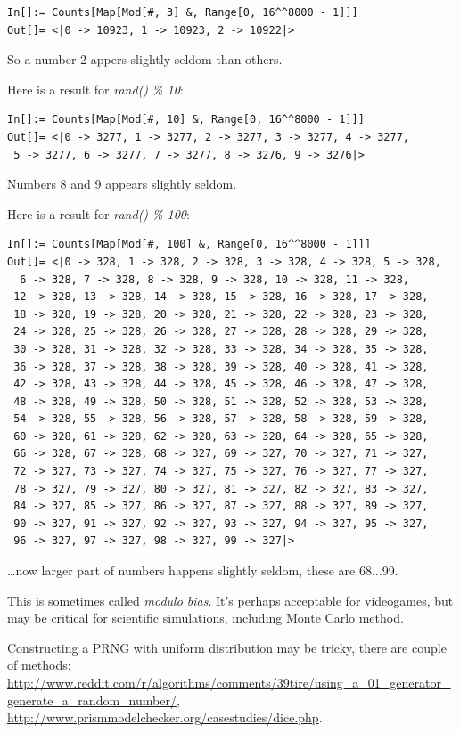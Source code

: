 \begin{lstlisting}
In[]:= Counts[Map[Mod[#, 3] &, Range[0, 16^^8000 - 1]]]
Out[]= <|0 -> 10923, 1 -> 10923, 2 -> 10922|>
\end{lstlisting}

So a number 2 appers slightly seldom than others.

Here is a result for \textit{rand() \% 10}:

\begin{lstlisting}
In[]:= Counts[Map[Mod[#, 10] &, Range[0, 16^^8000 - 1]]]
Out[]= <|0 -> 3277, 1 -> 3277, 2 -> 3277, 3 -> 3277, 4 -> 3277,
 5 -> 3277, 6 -> 3277, 7 -> 3277, 8 -> 3276, 9 -> 3276|>
\end{lstlisting}

Numbers 8 and 9 appears slightly seldom.

Here is a result for \textit{rand() \% 100}:

\begin{lstlisting}
In[]:= Counts[Map[Mod[#, 100] &, Range[0, 16^^8000 - 1]]]
Out[]= <|0 -> 328, 1 -> 328, 2 -> 328, 3 -> 328, 4 -> 328, 5 -> 328,
  6 -> 328, 7 -> 328, 8 -> 328, 9 -> 328, 10 -> 328, 11 -> 328,
 12 -> 328, 13 -> 328, 14 -> 328, 15 -> 328, 16 -> 328, 17 -> 328,
 18 -> 328, 19 -> 328, 20 -> 328, 21 -> 328, 22 -> 328, 23 -> 328,
 24 -> 328, 25 -> 328, 26 -> 328, 27 -> 328, 28 -> 328, 29 -> 328,
 30 -> 328, 31 -> 328, 32 -> 328, 33 -> 328, 34 -> 328, 35 -> 328,
 36 -> 328, 37 -> 328, 38 -> 328, 39 -> 328, 40 -> 328, 41 -> 328,
 42 -> 328, 43 -> 328, 44 -> 328, 45 -> 328, 46 -> 328, 47 -> 328,
 48 -> 328, 49 -> 328, 50 -> 328, 51 -> 328, 52 -> 328, 53 -> 328,
 54 -> 328, 55 -> 328, 56 -> 328, 57 -> 328, 58 -> 328, 59 -> 328,
 60 -> 328, 61 -> 328, 62 -> 328, 63 -> 328, 64 -> 328, 65 -> 328,
 66 -> 328, 67 -> 328, 68 -> 327, 69 -> 327, 70 -> 327, 71 -> 327,
 72 -> 327, 73 -> 327, 74 -> 327, 75 -> 327, 76 -> 327, 77 -> 327,
 78 -> 327, 79 -> 327, 80 -> 327, 81 -> 327, 82 -> 327, 83 -> 327,
 84 -> 327, 85 -> 327, 86 -> 327, 87 -> 327, 88 -> 327, 89 -> 327,
 90 -> 327, 91 -> 327, 92 -> 327, 93 -> 327, 94 -> 327, 95 -> 327,
 96 -> 327, 97 -> 327, 98 -> 327, 99 -> 327|>
\end{lstlisting}

\dots now larger part of numbers happens slightly seldom, these are 68...99.

This is sometimes called \textit{modulo bias}. It's perhaps acceptable for videogames, but may be critical for scientific simulations, including Monte Carlo method.

Constructing a \ac{PRNG} with uniform distribution may be tricky, there are couple of methods:
\url{http://www.reddit.com/r/algorithms/comments/39tire/using_a_01_generator_generate_a_random_number/},
\url{http://www.prismmodelchecker.org/casestudies/dice.php}.

\levelup{}

